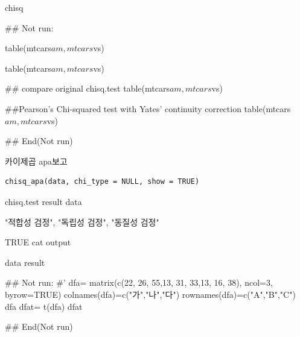\documentclass[a4paper]{book}
\begin{document}
%
\begin{Value}
chisq
\end{Value}
%
\begin{Examples}
\begin{ExampleCode}
## Not run: 

table(mtcars$am, mtcars$vs) %


table(mtcars$am, mtcars$vs) %

## compare original chisq.test
table(mtcars$am, mtcars$vs) %


##Pearson's Chi-squared test with Yates' continuity correction
table(mtcars$am, mtcars$vs) %

## End(Not run)


\end{ExampleCode}
\end{Examples}
%
\begin{Description}
카이제곱 apa보고
\end{Description}
%
\begin{Usage}
\begin{verbatim}
chisq_apa(data, chi_type = NULL, show = TRUE)
\end{verbatim}
\end{Usage}
%
\begin{Arguments}
\begin{ldescription}
\item[\code{data}] chisq.test result data

\item[\code{chi\_type}] "적합성 검정", "독립성 검정", "동질성 검정"

\item[\code{show}] TRUE cat output
\end{ldescription}
\end{Arguments}
%
\begin{Value}
data result
\end{Value}
%
\begin{Examples}
\begin{ExampleCode}

## Not run: 
#'
dfa= matrix(c(22, 26, 55,13, 31, 33,13, 16, 38), ncol=3, byrow=TRUE)
colnames(dfa)=c("가","나","다")
rownames(dfa)=c("A","B","C")
dfa
dfat= t(dfa)
dfat%

## End(Not run)
\end{ExampleCode}
\end{Examples}
\end{document}
